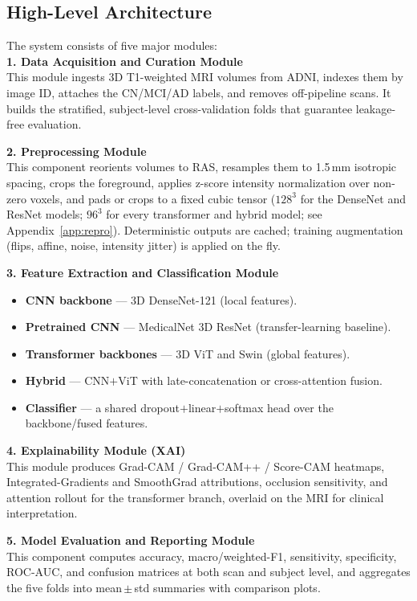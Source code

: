 \subsection{High-Level Architecture}
The system consists of five major modules:\\
\textbf{1. Data Acquisition and Curation Module} \\
This module ingests 3D T1-weighted MRI volumes from ADNI, indexes them by image ID, attaches the CN/MCI/AD labels, and removes off-pipeline scans. It builds the stratified, subject-level cross-validation folds that guarantee leakage-free evaluation.

\noindent\textbf{2. Preprocessing Module} \\
This component reorients volumes to RAS, resamples them to 1.5\,mm isotropic spacing, crops the foreground, applies z-score intensity normalization over non-zero voxels, and pads or crops to a fixed cubic tensor ($128^3$ for the DenseNet and ResNet models; $96^3$ for every transformer and hybrid model; see Appendix~\ref{app:repro}). Deterministic outputs are cached; training augmentation (flips, affine, noise, intensity jitter) is applied on the fly.

\noindent\textbf{3. Feature Extraction and Classification Module} \\
\begin{itemize}
    \item \textbf{CNN backbone} --- 3D DenseNet-121 (local features).
    \item \textbf{Pretrained CNN} --- MedicalNet 3D ResNet (transfer-learning baseline).
    \item \textbf{Transformer backbones} --- 3D ViT and Swin (global features).
    \item \textbf{Hybrid} --- CNN$+$ViT with late-concatenation or cross-attention fusion.
    \item \textbf{Classifier} --- a shared dropout$+$linear$+$softmax head over the backbone/fused features.
\end{itemize}

\noindent\textbf{4. Explainability Module (XAI)} \\
This module produces Grad-CAM / Grad-CAM++ / Score-CAM heatmaps, Integrated-Gradients and SmoothGrad attributions, occlusion sensitivity, and attention rollout for the transformer branch, overlaid on the MRI for clinical interpretation.

\noindent\textbf{5. Model Evaluation and Reporting Module} \\
This component computes accuracy, macro/weighted-F1, sensitivity, specificity, ROC-AUC, and confusion matrices at both scan and subject level, and aggregates the five folds into mean\,$\pm$\,std summaries with comparison plots.

